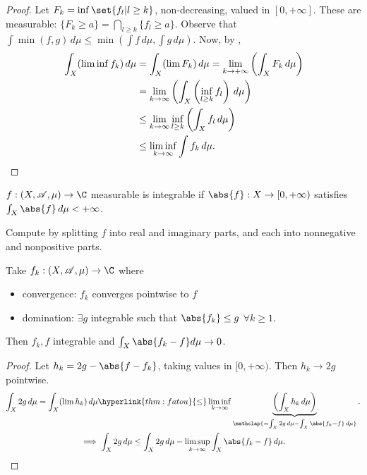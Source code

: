 \documentclass[twoside]{article}
\begin{document}
\begin{proof}
    Let $F_k = \inf\set{f_l | l \geq k}$, non-decreasing, valued in $[0, +\infty]$.
    These are measurable: $\{F_k \geq a\} = \bigcap_{l \geq k} \{f_l \geq a\}$.
    Observe that $\int \min(f, g) \, d\mu \leq \min(\int f \, d\mu, \int g \, d\mu)$.
    Now, by \hyperlink{thm:Beppo},
    \begin{align*}
        \int_X (\liminf f_k) \, d\mu &= \int_X (\lim F_k) \, d\mu = \lim_{k \to +\infty} \left(\int_X F_k \, d\mu\right) \\
                                     &= \lim_{k \to \infty} \left(\int_X \left( \inf_{l \geq k} f_l\right) \, d\mu\right) \\
                                     &\leq \lim_{k \to \infty} \inf_{l \geq k} \left(\int_X f_l \, d\mu\right)\\
                                     &\leq \liminf_{k \to \infty} \int f_k \, d\mu.\qedhere
    \end{align*}
\end{proof}
\begin{defi}[Integrable]
    $f: (X, \mathscr{A}, \mu) \to \C$ measurable is integrable if $\abs{f}: X \to [0, +\infty)$ satisfies $\int_X \abs{f} \, d\mu < +\infty$.
\end{defi}
Compute by splitting $f$ into real and imaginary parts, and each into nonnegative and nonpositive parts.

\begin{thm}
    Take $f_k: (X, \mathscr{A}, \mu) \to \C$ where
    \begin{itemize}
        \item convergence: $f_k$ converges pointwise to $f$
        \item domination: $\exists g$ integrable such that $\abs{f_k} \leq g$ $\forall k \geq 1$.
    \end{itemize}
    Then $f_k, f$ integrable and $\int_X \abs{f_k - f} d \mu \to 0$.
\end{thm}

\begin{proof}
    Let $h_k = 2g - \abs{f - f_k}$, taking values in $[0, +\infty)$.
    Then $h_k \to 2g$ pointwise.
    \begin{gather*}
        \int_X 2g \, d\mu = \int_X (\lim h_k) \, d\mu \hyperlink{thm:fatou}{\leq} \liminf_{k \to \infty} \underbrace{\left(\int_X h_k \, d\mu\right)}_{\mathclap{ = \int_X 2g \, d\mu - \int_X \abs{f_k-f} \, d\mu}}. \\
        \implies \int_X 2g \, d\mu \leq \int_X 2g \, d\mu - \limsup_{k \to \infty} \int_X \abs{f_k - f} \, d\mu.\qedhere
    \end{gather*}
\end{proof}
\end{document}
